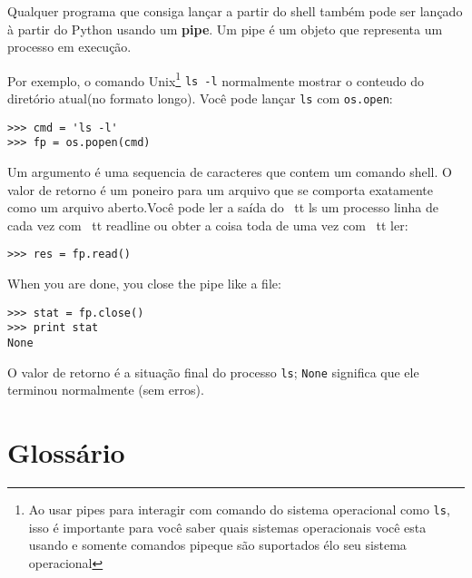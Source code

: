 \documentclass{book}
\begin{document}

Qualquer programa que consiga lançar a partir do shell também pode ser
lançado à partir do Python usando um {\bf pipe}. Um pipe é um objeto
que representa um processo em execução.


Por exemplo, o comando Unix\footnote{Ao usar pipes para interagir com comando do sistema operacional como  {\tt ls},
isso é importante para você saber quais sistemas operacionais você esta usando e somente comandos pipeque
são suportados élo seu sistema operacional }
{\tt ls -l} normalmente mostrar o conteudo do diretório atual(no formato longo). 
Você pode lançar {\tt ls} com {\tt os.open}:


\begin{verbatim}
>>> cmd = 'ls -l'
>>> fp = os.popen(cmd)
\end{verbatim}

%

Um argumento é uma sequencia de caracteres que contem um comando shell. O
valor de retorno  é um poneiro para um arquivo que se comporta exatamente como um arquivo
aberto.Você pode ler a saída do {\ tt ls} um processo
linha de cada vez com {\ tt readline} ou obter a coisa toda de
uma vez com {\ tt ler}:


\begin{verbatim}
>>> res = fp.read()
\end{verbatim}

%
When you are done, you close the pipe like a file:


\begin{verbatim}
>>> stat = fp.close()
>>> print stat
None
\end{verbatim}

%
O valor de retorno é a situação final do processo {\tt ls};
{\tt None} significa que ele terminou normalmente (sem erros).

\section{Glossário}
\end{document}
